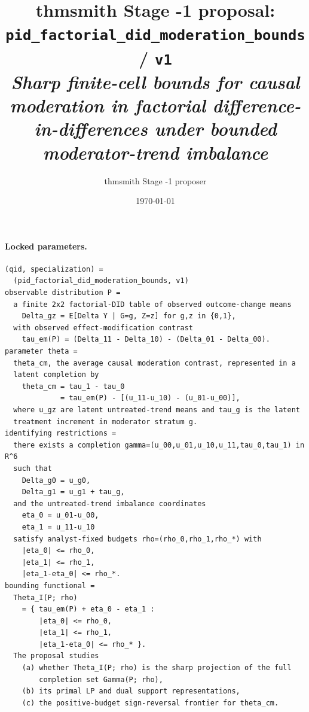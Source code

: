 \documentclass[11pt]{article}
\title{thmsmith Stage -1 proposal: \texttt{pid\_factorial\_did\_moderation\_bounds} / \texttt{v1}%
  \\ \large\textit{Sharp finite-cell bounds for causal moderation in factorial difference-in-differences under bounded moderator-trend imbalance}}
\author{thmsmith Stage -1 proposer}
\date{\today}
\theoremstyle{definition}
\theoremstyle{plain}
\theoremstyle{remark}
\begin{document}
\maketitle


\paragraph{Locked parameters.}
\begin{verbatim}
(qid, specialization) =
  (pid_factorial_did_moderation_bounds, v1)
observable distribution P =
  a finite 2x2 factorial-DID table of observed outcome-change means
    Delta_gz = E[Delta Y | G=g, Z=z] for g,z in {0,1},
  with observed effect-modification contrast
    tau_em(P) = (Delta_11 - Delta_10) - (Delta_01 - Delta_00).
parameter theta =
  theta_cm, the average causal moderation contrast, represented in a
  latent completion by
    theta_cm = tau_1 - tau_0
             = tau_em(P) - [(u_11-u_10) - (u_01-u_00)],
  where u_gz are latent untreated-trend means and tau_g is the latent
  treatment increment in moderator stratum g.
identifying restrictions =
  there exists a completion gamma=(u_00,u_01,u_10,u_11,tau_0,tau_1) in R^6
  such that
    Delta_g0 = u_g0,
    Delta_g1 = u_g1 + tau_g,
  and the untreated-trend imbalance coordinates
    eta_0 = u_01-u_00,
    eta_1 = u_11-u_10
  satisfy analyst-fixed budgets rho=(rho_0,rho_1,rho_*) with
    |eta_0| <= rho_0,
    |eta_1| <= rho_1,
    |eta_1-eta_0| <= rho_*.
bounding functional =
  Theta_I(P; rho)
    = { tau_em(P) + eta_0 - eta_1 :
        |eta_0| <= rho_0,
        |eta_1| <= rho_1,
        |eta_1-eta_0| <= rho_* }.
  The proposal studies
    (a) whether Theta_I(P; rho) is the sharp projection of the full
        completion set Gamma(P; rho),
    (b) its primal LP and dual support representations,
    (c) the positive-budget sign-reversal frontier for theta_cm.
\end{verbatim}
\end{document}
